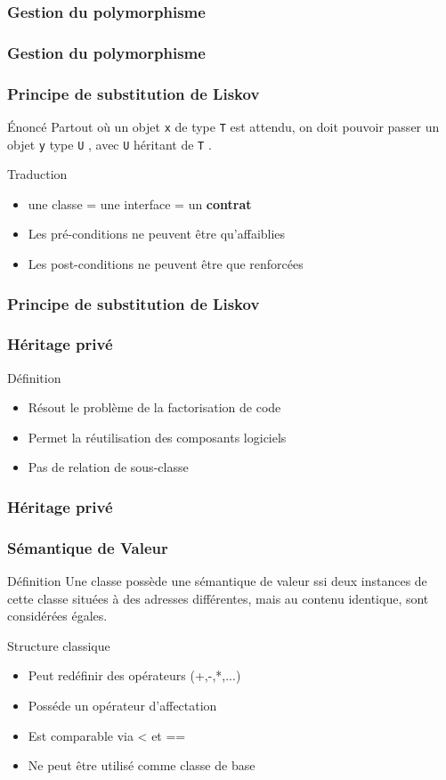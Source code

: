 \documentclass[svgnames]{beamer}
\begin{document}
\frame
{
  \frametitle{Gestion du polymorphisme}
}

\frame
{
  \frametitle{Gestion du polymorphisme}
}

\frame
{
  \frametitle{Principe de substitution de Liskov}
  \begin{block}{\'Enonc\'e}
  Partout o\`u un objet \texttt{x} de type \texttt{T} est attendu, on doit pouvoir passer 
  un objet \texttt{y} type \texttt{U} , avec \texttt{U}  héritant de \texttt{T} .
  \end{block}

  \begin{block}{Traduction}
  \begin{itemize}
  \item une classe = une interface = un \textbf{contrat}
  \item Les pr\'e-conditions ne peuvent \^etre qu'affaiblies
  \item Les post-conditions ne peuvent \^etre que renforcées
  \end{itemize}
  \end{block}
}

\frame
{
  \frametitle{Principe de substitution de Liskov}
}

\frame
{
  \frametitle{Héritage privé}
  \begin{block}{Définition}
  \begin{itemize}
  \item Résout le problème de la factorisation de code
  \item Permet la réutilisation des composants logiciels
  \item Pas de relation de sous-classe
  \end{itemize}

  \end{block}{}
}

\frame
{
  \frametitle{Héritage privé}
}

\frame
{
  \frametitle{Sémantique de Valeur }
  \begin{block}{Définition}
  Une classe possède une sémantique de valeur ssi deux instances de
  cette classe situées à des adresses différentes, mais au contenu
   identique, sont considérées égales.
  \end{block}

  \begin{block}{Structure classique}
  \begin{itemize}
  \footnotesize
  \item Peut redéfinir des opérateurs (+,-,*,...)
  \item Posséde un opérateur d'affectation
  \item Est comparable via < et ==
  \item Ne peut être utilisé comme classe de base
  \end{itemize}
  \end{block}
}
\end{document}
